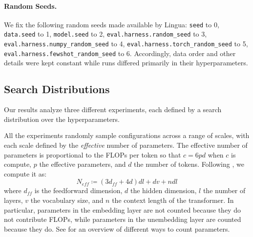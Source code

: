 \paragraph{Random Seeds.} We fix the following random seeds made available by Lingua: \texttt{seed} to 0, \texttt{data\-.seed} to 1, \texttt{model\-.seed} to 2, \texttt{eval\-.harness\-.random\_seed} to 3, \texttt{eval\-.harness\-.numpy\_random\_seed} to 4, \texttt{eval\-.harness\-.torch\_random\_seed} to 5, \texttt{eval\-.harness\-.fewshot\_random\_seed} to 6. Accordingly, data order and other details were kept constant while runs differed primarily in their hyperparameters.

\subsection{Search Distributions}
\label{app:experimental-design:search-distributions}

Our results analyze three different experiments, each defined by a search distribution over the hyperparameters.

All the experiments randomly sample configurations across a range of scales, with each scale defined by the \emph{effective} number of parameters. The effective number of parameters is proportional to the FLOPs per token so that $c = 6pd$ when $c$ is compute, $p$ the effective parameters, and $d$ the number of tokens. Following \citet[\S B]{Porian2024Resolving}, we compute it as:
%
\begin{equation}\label{eq:effective-number-of-parameters}
    N_{eff} \coloneqq \left(3 d_{ff} + 4d\right)dl + dv + ndl
\end{equation}
%
where $d_{ff}$ is the feedforward dimension, $d$ the hidden dimension, $l$ the number of layers, $v$ the vocabulary size, and $n$ the context length of the transformer. In particular, parameters in the embedding layer are not counted because they do not contribute FLOPs, while parameters in the unembedding layer are counted because they do. See \citet[\S B]{Porian2024Resolving} for an overview of different ways to count parameters.

